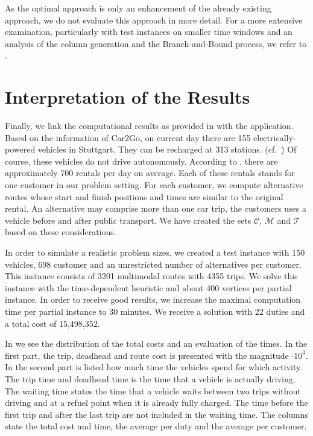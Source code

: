 As the optimal approach is only an enhancement of the already existing approach, we do not evaluate this approach in more detail. For a more extensive examination, particularly with test instances on smaller time windows and an analysis of the column generation and the Branch-and-Bound process, we refer to \cite[Sec.~10.2]{Kaiser}. 


\section{Interpretation of the Results}
\label{sec:interpretation}

Finally, we link the computational results as provided in  with the application. Based on the information of Car2Go, on current day there are 155 electrically-powered vehicles in Stuttgart. They can be recharged at 313 stations. (cf.~\cite[p.~144]{Kaiser}) Of course, these vehicles do not drive autonomously. According to , there are approximately 700 rentals per day on average. Each of these rentals stands for one customer in our problem setting. For each customer, we compute alternative routes whose start and finish positions and times are similar to the original rental. An alternative may comprise more than one car trip, \ie the customers uses a vehicle before and after public transport. We have created the sets $\mathcal{C}$, $\mathcal{M}$ and $\mathcal{T}$ based on these considerations.

In order to simulate a realistic problem sizes, we created a test instance with 150 vehicles, 698 customer and an unrestricted number of alternatives per customer. This instance consists of 3201 multimodal routes with 4355 trips. We solve this instance with the time-dependent heuristic and about 400 vertices per partial instance. In order to receive good results, we increase the maximal computation time per partial instance to 30 minutes. We receive a solution with 22 duties and a total cost of 15,498,352.

In  we see the distribution of the total costs and an evaluation of the times. In the first part, the trip, deadhead and route cost is presented with the magnitude ${\cdot 10^3}$. In the second part is listed how much time the vehicles spend for which activity. The trip time and deadhead time is the time that a vehicle is actually driving. The waiting time states the time that a vehicle waits between two trips without driving and at a refuel point when it is already fully charged. The time before the first trip and after the last trip are not included in the waiting time. The columns state the total cost and time, the average per duty and the average per customer. 


